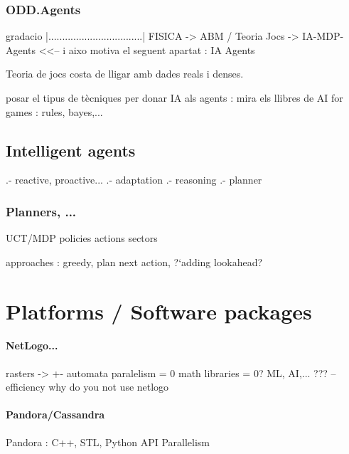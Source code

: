 \documentclass{report}
\begin{document}
	\subsection{ODD.Agents} %


gradacio 
|..................................|
FISICA -> ABM / Teoria Jocs -> IA-MDP-Agents <<-- i aixo motiva el seguent apartat : IA Agents

Teoria de jocs costa de lligar amb dades reals i denses.


posar el tipus de t\`ecniques per donar IA als agents : mira els llibres de AI for games : rules, bayes,...

	\section{Intelligent agents} %

	  .- reactive, proactive...
	  .- adaptation
	  .- reasoning
	  .- planner

	  \subsection{Planners, ...}

	    UCT/MDP
	    policies
	    actions
	    sectors

	    approaches : greedy, plan next action, ?`adding lookahead?



	   \chapter{Platforms / Software packages}
		\subsubsection{NetLogo...}

		    rasters -> +- automata
		    paralelism = 0
		    math libraries = 0?
		    ML, AI,... ???
		    -- efficiency
		    why do you not use netlogo

		\subsubsection{Pandora/Cassandra}

		Pandora : C++, STL, Python API
		Parallelism %
	      
\end{document}
